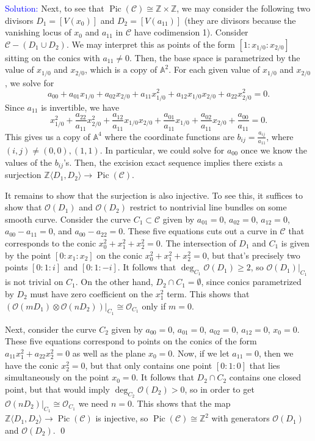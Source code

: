 \documentclass[11pt]{article}
\renewcommand{\AA}{\mathbb{A}}
\newcommand{\ZZ}{\mathbb{Z}}
\newcommand{\cC}{\mathcal{C}}
\newcommand{\cO}{\mathcal{O}}
\newcommand{\Pic}{\operatorname{Pic}}
\newenvironment{solution}{\begin{trivlist}\item[]{\textcolor{blue}{Solution:}}}{\qed \end{trivlist}}
\begin{document}
\begin{solution}
    Next, to see that $\Pic(\cC) \cong \ZZ \times \ZZ$, we may consider the following two divisors $D_1 = [V(x_0)]$ and $D_2 = [V(a_{11})]$ (they are divisors because the vanishing locus of $x_0$ and $a_{11}$ in $\cC$ have codimension 1). Consider $\cC - (D_1 \cup D_2)$. We may interpret this as points of the form $[1: x_{1/0}: x_{2/0}]$ sitting on the conics with $a_{11} \neq 0$. Then, the base space is parametrized by the value of $x_{1/0}$ and $x_{2/0}$, which is a copy of $\AA^2$. For each given value of $x_{1/0}$ and $x_{2/0}$, we solve for 
    \[
        a_{00} + a_{01} x_{1/0} + a_{02} x_{2/0} + a_{11} x_{1/0}^2 + a_{12} x_{1/0} x_{2/0} + a_{22} x_{2/0}^2 = 0.
    \]
    Since $a_{11}$ is invertible, we have 
    \[
        x_{1/0}^2 
        + \frac{a_{22}}{a_{11}} x_{2/0}^2
        + \frac{a_{12}}{a_{11}} x_{1/0} x_{2/0}
        + \frac{a_{01}}{a_{11}} x_{1/0} 
        + \frac{a_{02}}{a_{11}} x_{2/0} 
        + \frac{a_{00}}{a_{11}} 
        = 0.
    \]
    This gives us a copy of $\AA^4$ where the coordinate functions are $b_{ij} = \frac{a_{ij}}{a_{11}}$, where $(i,j) \neq (0,0), (1,1)$. In particular, we could solve for $a_{00}$ once we know the values of the $b_{ij}$'s. Then, the excision exact sequence implies there exists a surjection $\ZZ \langle D_1, D_2 \rangle \rightarrow \Pic(\cC)$. 

    It remains to show that the surjection is also injective. To see this, it suffices to show that $\cO(D_1)$ and $\cO(D_2)$ restrict to nontrivial line bundles on some smooth curve. Consider the curve $C_1 \subset \cC$ given by $a_{01} = 0$, $a_{02} = 0$, $a_{12} = 0$, $a_{00} - a_{11} = 0$, and $a_{00} - a_{22} = 0$. These five equations cuts out a curve in $\cC$ that corresponds to the conic $x_0^2 + x_1^2 + x_2^2 = 0$. The intersection of $D_1$ and $C_1$ is given by the point $[0:x_1:x_2]$ on the conic $x_0^2 + x_1^2 + x_2^2 = 0$, but that's precisely two points $[0:1:i]$ and $[0:1:-i]$. It follows that $\deg_{C_1} \cO(D_1) \geq 2$, so $\cO(D_1)|_{C_1}$ is not trivial on $C_1$. On the other hand, $D_2 \cap C_1 = \emptyset$, since conics parametrized by $D_2$ must have zero coefficient on the $x_1^2$ term. This shows that $(\cO(mD_1) \otimes \cO(nD_2))|_{C_1} \cong \cO_{C_1}$ only if $m = 0$. 
    
    Next, consider the curve $C_2$ given by $a_{00} = 0$, $a_{01} = 0$, $a_{02} = 0$, $a_{12} = 0$, $x_0 = 0$. These five equations correspond to points on the conics of the form $a_{11}x_1^2 + a_{22}x_2^2 = 0$ as well as the plane $x_0 = 0$. Now, if we let $a_{11} = 0$, then we have the conic $x_2^2 = 0$, but that only contains one point $[0:1:0]$ that lies simultaneously on the point $x_0 = 0$. It follows that $D_2 \cap C_2$ contains one closed point, but that would imply $\deg_{C_2} \cO(D_2) > 0$, so in order to get $\cO(nD_2)|_{C_1} \cong \cO_{C_1}$ we need $n = 0$. This shows that the map $\ZZ \langle D_1, D_2 \rangle \rightarrow \Pic(\cC)$ is injective, so $\Pic(\cC) \cong \ZZ^2$ with generators $\cO(D_1)$ and $\cO(D_2)$.
\end{solution}
\end{document}
